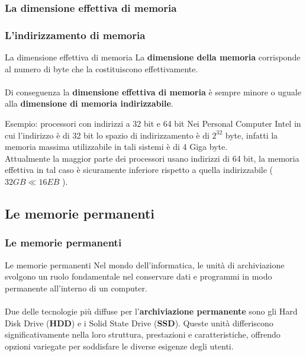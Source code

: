\subsubsection[La dimensione effettiva di memoria]{La dimensione effettiva di memoria}
\begin{frame}
	\frametitle{L'indirizzamento di memoria}
	
	\begin{block}{La dimensione effettiva di memoria}
		La \textbf{dimensione della memoria} corrisponde al numero di byte che la costituiscono effettivamente.\\~\\
		Di conseguenza la \textbf{dimensione effettiva di memoria} è sempre minore o uguale alla \textbf{dimensione di memoria indirizzabile}.		
	\end{block}
	
	\begin{block}{Esempio: processori con indirizzi a 32 bit e 64 bit}
		Nei Personal Computer Intel in cui l'indirizzo è di 32 bit lo spazio di indirizzamento è di $2^{32}$ byte, infatti la memoria massima utilizzabile in tali sistemi è di 4 Giga byte.\\
		Attualmente la maggior parte dei processori usano indirizzi di 64 bit, la memoria effettiva in tal caso è sicuramente inferiore rispetto a quella indirizzabile ($32GB \ll 16EB$ ).
		
	\end{block}
\end{frame}





\subsection[Le memorie permanenti]{Le memorie permanenti}
\begin{frame}
	\frametitle{Le memorie permanenti}
	  
	\begin{block}{Le memorie permanenti}
		Nel mondo dell'informatica, le unità di archiviazione svolgono un ruolo fondamentale nel conservare dati e programmi in modo permanente all'interno di un computer.\\~\\
		Due delle tecnologie più diffuse per l'\textbf{archiviazione permanente} sono gli Hard Disk Drive (\textbf{HDD}) e i Solid State Drive (\textbf{SSD}). Queste unità differiscono significativamente nella loro struttura, prestazioni e caratteristiche, offrendo opzioni variegate per soddisfare le diverse esigenze degli utenti.
		
	\end{block}
\end{frame}



